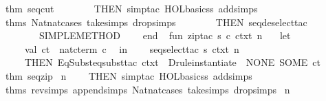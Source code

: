 \begin{isabellebody}
\isaantiq
thm\ seq{}cut{}%
\endisaantiq
{}\ {}\isanewline
\ \ \ \ \ \ THEN\ simp{}tac\ {}HOL{}basic{}ss\ addsimps\ %
\isaantiq
thms\ Nat{}nat{}cases\ take{}simps\ drop{}simps{}%
\endisaantiq
{}\ {}\isanewline
\ \ \ \ \ \ THEN\ seq{}deselect{}tac\ {}\isanewline
\ \ \ \ \ \ {}{}\ SIMPLE{}METHOD\isanewline
\ \ \ \ end{}\isanewline
{}\isanewline
\isanewline
{}\isamarkupfalse%
\ {}\isanewline
fun\ zip{}tac\ s\ c\ ctxt\ n\ {}\isanewline
\ \ let\isanewline
\ \ \ \ val\ ct\ {}\ nat{}cterm\ c\isanewline
\ \ in\isanewline
\ \ \ \ seq{}select{}tac\ s\ ctxt\ n\isanewline
\ \ \ \ THEN\ EqSubst{}eqsubst{}tac\ ctxt\ {}{}{}\ {}Drule{}instantiate{}\ {}{}\ {}NONE{}\ SOME\ ct{}\ %
\isaantiq
thm\ seq{}zip{}%
\endisaantiq
{}\ n\isanewline
\ \ \ \ THEN\ simp{}tac\ {}HOL{}basic{}ss\ addsimps\ %
\isaantiq
thms\ rev{}simps\ append{}simps\ Nat{}nat{}cases\ take{}simps\ drop{}simps{}%
\endisaantiq
{}\ n\isanewline

\end{isabellebody}

